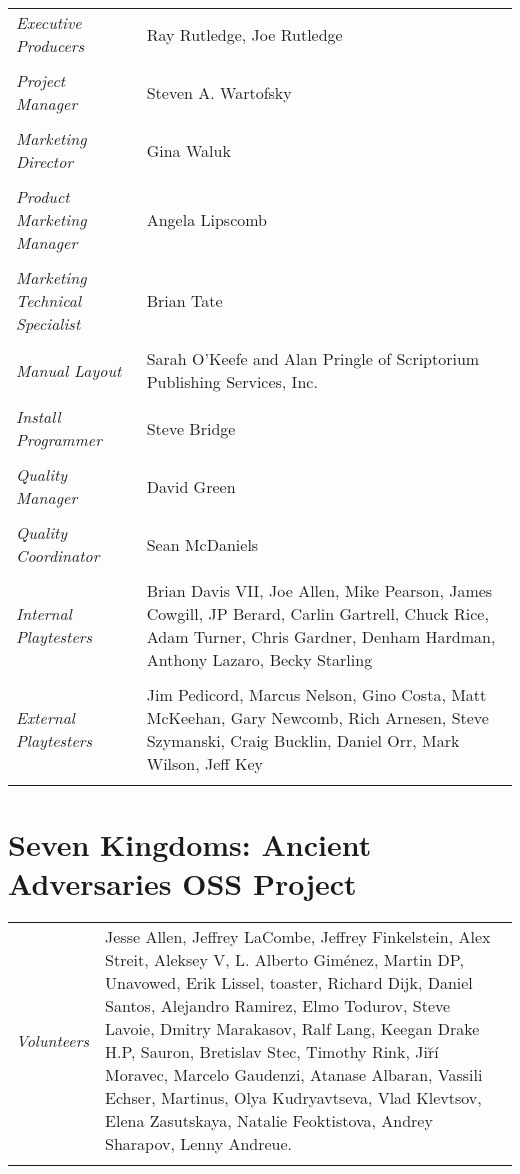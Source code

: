 \begin{tabular}{p{1in} p{3in}}
    \textit{Executive Producers} & Ray Rutledge, Joe Rutledge \\ \\
    \textit{Project Manager} & Steven A. Wartofsky \\ \\
    \textit{Marketing Director} & Gina Waluk \\ \\
    \textit{Product Marketing Manager} & Angela Lipscomb \\ \\
    \textit{Marketing Technical Specialist}    & Brian Tate \\ \\
    \textit{Manual Layout} & Sarah O’Keefe and Alan Pringle of Scriptorium Publishing Services, Inc. \\ \\
    \textit{Install Programmer}    & Steve Bridge \\ \\
    \textit{Quality Manager} & David Green \\ \\
    \textit{Quality Coordinator} & Sean McDaniels \\ \\
    \textit{Internal Playtesters} & Brian Davis VII, Joe Allen, Mike Pearson, James Cowgill, JP Berard, Carlin Gartrell, Chuck Rice, Adam Turner, Chris Gardner, Denham Hardman, Anthony Lazaro, Becky Starling \\ \\
    \textit{External Playtesters} & Jim Pedicord, Marcus Nelson, Gino Costa, Matt McKeehan, Gary Newcomb, Rich Arnesen, Steve Szymanski, Craig Bucklin, Daniel Orr, Mark Wilson, Jeff Key \\ \\
\end{tabular}

\clearpage

\section{\textsf{Seven Kingdoms: Ancient Adversaries OSS Project}}


\begin{tabular}{p{1in} p{3in}}
    \textit{Volunteers} & Jesse Allen, Jeffrey LaCombe, Jeffrey Finkelstein, Alex Streit, Aleksey V, L. Alberto Giménez, Martin DP, Unavowed, Erik Lissel, toaster, Richard Dijk, Daniel Santos, Alejandro Ramirez, Elmo Todurov, Steve Lavoie, Dmitry Marakasov, Ralf Lang, Keegan Drake H.P, Sauron, Bretislav Stec, Timothy Rink, Ji\u{r}í Moravec, Marcelo Gaudenzi, Atanase Albaran, Vassili Echser, Martinus, Olya Kudryavtseva, Vlad Klevtsov, Elena Zasutskaya, Natalie Feoktistova, Andrey Sharapov, Lenny Andreue. \\ \\
\end{tabular}